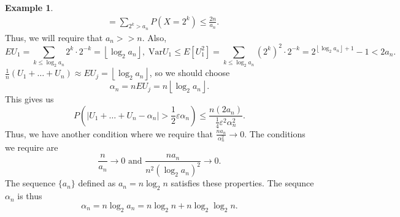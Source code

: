 \documentclass[15pt,a4paper]{book}
\theoremstyle{definition}
\newtheorem{example}[theorem]{Example}
\newcommand{\abs}[1]{\left| #1 \right|} %
\newcommand{\Var}{\text{Var}}
\newcommand{\floor}[1]{\left\lfloor #1 \right\rfloor} %
\begin{document}
\begin{example}
\begin{align}
        &= \sum_{2^{k}>a_{n}} P(X=2^{k}) \leq \frac{2n}{a_{n}}.
    \end{align}
    Thus, we will require that $a_{n} >> n$. Also,
    \begin{equation}
        EU_{1} = \sum_{k \leq \log_{2}a_{n}} 2^{k} \cdot 2^{-k} = \floor{\log_{2}a_{n}}, \; \Var{U_{1}} \leq E[U_{1}^{2}] = \sum_{k \leq \log_{2}a_{n}} (2^{k})^{2} \cdot 2^{-k} = 2^{\floor{\log_{2}a_{n}}+1}-1 < 2a_{n}.
    \end{equation}
    $\frac{1}{n}(U_{1}+\ldots+U_{n}) \approx EU_{j} = \floor{\log_{2}a_{n}}$, so we should choose
    \begin{equation}
        \alpha_{n} = n EU_{j} = n \floor{\log_{2}a_{n}}.
    \end{equation}
    This gives us
    \begin{equation}
        P(\abs{U_{1}+\ldots+U_{n}-\alpha_{n}} > \frac{1}{2}\varepsilon \alpha_{n}) \leq \frac{n(2a_{n})}{\frac{1}{4}\varepsilon^{2}\alpha_{n}^{2}}.
    \end{equation}
    Thus, we have another condition where we require that $\frac{na_{n}}{\alpha_{n}^{2}} \to 0$. The conditions we require are
    \begin{equation*}
        \frac{n}{a_{n}} \to 0 \text{ and } \frac{na_{n}}{n^{2}(\log_{2}a_{n})^{2}} \to 0.
    \end{equation*}
    The sequence $\{a_{n}\}$ defined as $a_{n} = n \log_{2} n$ satisfies these properties. The sequnce $\alpha_{n}$ is thus
    \begin{equation}
        \alpha_{n} = n \log_{2} a_{n} = n \log_{2} n + n \log_{2} \log_{2} n.
    \end{equation}
\end{example}

\end{document}
